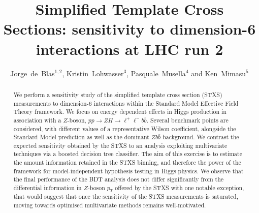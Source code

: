 \documentclass[11pt]{cernrep}
\begin{document}
\title{
Simplified Template Cross Sections: sensitivity to dimension-6 interactions at LHC run 2}
\author{Jorge~de~Blas$^{1,2}$,
Kristin~Lohwasser$^3$, Pasquale~Musella$^4$ and Ken~Mimasu$^5$}
\maketitle

\begin{abstract}
We perform a sensitivity study of the simplified template cross section (STXS) measurements to dimension-6 interactions within the Standard Model Effective Field Theory framework. We focus on energy dependent effects in Higgs production in association with a $Z$-boson, $p p \to Z H \to \ell^+\ell^- b\bar{b}$. Several benchmark points are considered, with different values of a representative Wilson coefficient, alongside the Standard Model prediction as well as the dominant $Zb\bar{b}$ background. We contrast the expected sensitivity obtained by the STXS to an analysis exploiting multivariate techniques via a boosted decision tree classifier. The aim of this exercise is to estimate the amount information retained in the STXS binning, and therefore the power of the framework for model-independent hypothesis testing in Higgs physics. We observe that the final performance of the BDT analysis does not differ significantly from the differential information in $Z$-boson $p_T$ offered by the STXS with one notable exception, that would suggest  that once the sensitivity of the STXS measurements is saturated, moving towards optimised multivariate methods remains well-motivated. 
\end{abstract}


\newpage
\end{document}
